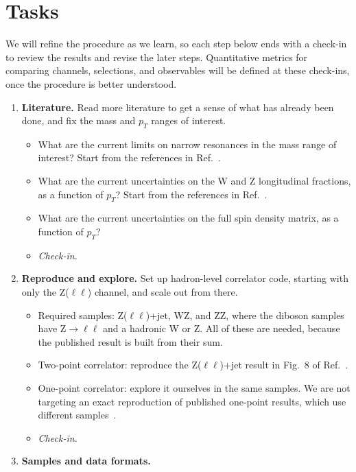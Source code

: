 \documentclass[11pt]{article}
\begin{document}
\section{Tasks}

We will refine the procedure as we learn, so each step below ends with a check-in to review the results and revise the later steps.
Quantitative metrics for comparing channels, selections, and observables will be defined at these check-ins, once the procedure is better understood.

\begin{enumerate}
    \item \textbf{Literature.} Read more literature to get a sense of what has already been done, and fix the mass and \(p_T\) ranges of interest.
    \begin{itemize}
        \item What are the current limits on narrow resonances in the mass range of interest? Start from the references in Ref.~\cite{Ricci:2026fkj}.
        \item What are the current uncertainties on the W and Z longitudinal fractions, as a function of \(p_T\)? Start from the references in Ref.~\cite{Gao:2026hoj}.
        \item What are the current uncertainties on the full spin density matrix, as a function of \(p_T\)?
        \item \emph{Check-in.}
    \end{itemize}
    \item \textbf{Reproduce and explore.} Set up hadron-level correlator code, starting with only the Z(\(\ell\ell\)) channel, and scale out from there.
    \begin{itemize}
        \item Required samples: Z(\(\ell\ell\))+jet, WZ, and ZZ, where the diboson samples have Z\(\to\ell\ell\) and a hadronic W or Z. All of these are needed, because the published result is built from their sum.
        \item Two-point correlator: reproduce the Z(\(\ell\ell\))+jet result in Fig.~8 of Ref.~\cite{Gao:2026hoj}.
        \item One-point correlator: explore it ourselves in the same samples. We are not targeting an exact reproduction of published one-point results, which use different samples~\cite{ricciEnergyCorrelatorsHadronically2022}.
        \item \emph{Check-in.}
    \end{itemize}
    \item \textbf{Samples and data formats.}

\end{enumerate}
\end{document}

